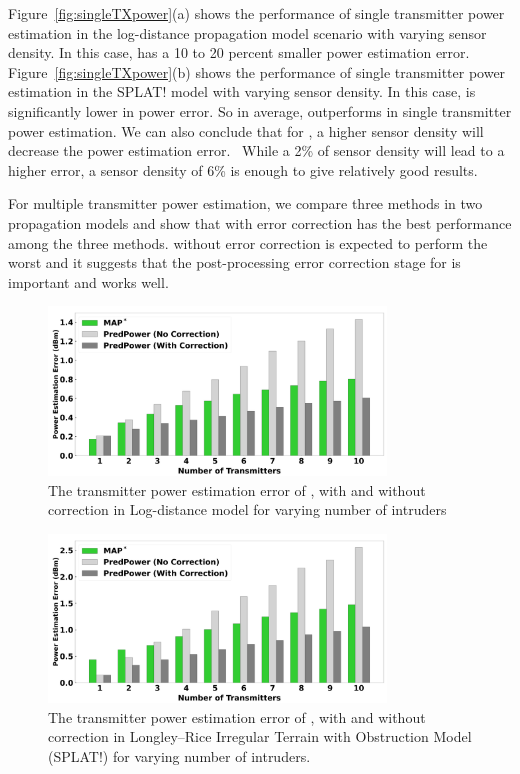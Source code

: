 Figure~\ref{fig:singleTXpower}(a) shows the performance of single transmitter power estimation in the log-distance propagation model scenario with varying sensor density.
In this case, \map has a 10 to 20 percent smaller power estimation error.
Figure~\ref{fig:singleTXpower}(b) shows the performance of single transmitter power estimation in the SPLAT! model with varying sensor density.
In this case, \power is significantly lower in power error.
So in average, \power outperforms \map in single transmitter power estimation.
We can also conclude that for \power, a higher sensor density will decrease the power estimation error. \
While a 2\% of sensor density will lead to a higher error, a sensor density of 6\% is enough to give relatively good results.

For multiple transmitter power estimation, we compare three methods in two propagation models and show that \power with error correction has the best performance among the three methods.
\power without error correction is expected to perform the worst and it suggests that the post-processing error correction stage for \power is important and works well.
\begin{figure}[t]
    \centering
    \includegraphics[width=0.8\textwidth]{chapters/wowmom-pmc/figures/logdist-powererror_varyintru.png}
    \caption{The transmitter power estimation error of \map, \power with and without correction in Log-distance model for varying number of intruders}
    \label{fig:logdistance-multiTXpower}
\end{figure}
\begin{figure}[t]
    \centering
    \includegraphics[width=0.8\textwidth]{chapters/wowmom-pmc/figures/splat-powererror_varyintru.png}
    \caption{The transmitter power estimation error of \map,  \power with and without correction in Longley--Rice Irregular Terrain with Obstruction Model (SPLAT!) for varying number of intruders.}
    \label{fig:splat-multiTXpower}
\end{figure}
